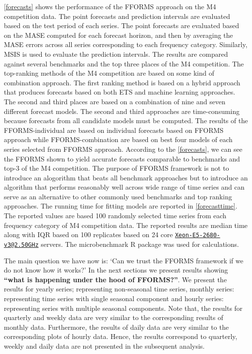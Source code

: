 \documentclass[11pt,a4paper,]{article}
\begin{document}
\autoref{forecasts} shows the performance of the FFORMS approach on the M4 competition data. The point forecasts and prediction intervals are evaluated based on the test period of each series. The point forecasts are evaluated based on the MASE computed for each forecast horizon, and then by averaging the MASE errors across all series corresponding to each frequency category. Similarly, MSIS is used to evaluate the prediction intervals. The results are compared against several benchmarks and the top three places of the M4 competition. The top-ranking methods of the M4 competition are based on some kind of combination approach. The first ranking method is based on a hybrid approach that produces forecasts based on both ETS and machine learning approaches. The second and third places are based on a combination of nine and seven different forecast models. The second and third approaches are time-consuming because forecasts from all candidate models must be computed. The results of the FFORMS-individual are based on individual forecasts based on FFORMS approach while FFORMS-combination are based on best four models of each series selected from FFORMS approach. According to the \autoref{forecasts}, we can see the FFORMS shown to yield accurate forecasts comparable to benchmarks and top-3 of the M4 competition. The purpose of FFORMS framework is not to introduce an alogorithm that beats all benchmark approaches but to introduce an algorithm that performs reasonably well across wide range of time series and can serve as an alternative to other commonly used benchmarks and top ranking approaches. The running time for fitting models are reported in \autoref{forecasttime}. The reported values are based 100 randomly selected time series from each frequency category of M4 competition data. The reported results are median time along with IQR based on 100 replicates based on 24 core \href{mailto:Xeon-E5-2680-v3@2.50GHz}{\nolinkurl{Xeon-E5-2680-v3@2.50GHz}} servers. The microbenchmark \autocite{microbench} R package was used for calculations.

The main question we have now is: `Can we trust the FFORMS framework if we do not know how it works?' In the next sections we present results showing \textbf{``what is happening under the hood of FFORMS?''}. We present the results for yearly series; representing non-seasonal time series, monthly series: representing time series with single seasonal component and hourly series: representing series with multiple seasonal components. Note that, the results for quarterly and weekly data are very similar to the corresponding results of monthly data. Furthermore, the results of daily data are very similar to the corresponding plots of hourly data. Hence, the results correspond to quarterly, weekly and daily data are not presented in the subsequent analysis.
\end{document}
